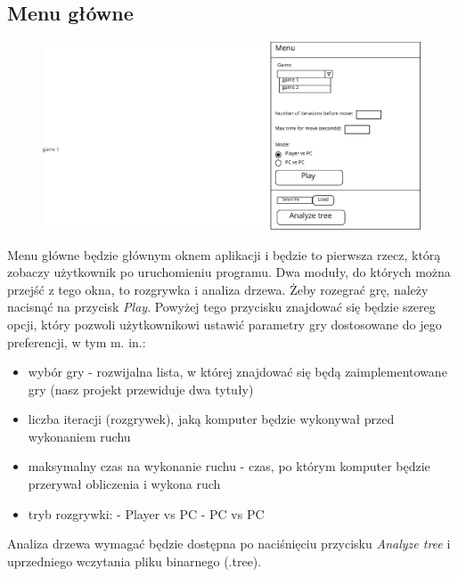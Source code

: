 \documentclass{article}
\begin{document}
	\subsection{Menu główne}
	\begin{figure}[h!]
		\centering
		\includegraphics[scale=0.8, trim={18.8cm 0 0 0},clip]{menu-eps}
	\end{figure}
	Menu główne będzie głównym oknem aplikacji i będzie to pierwsza rzecz, którą zobaczy użytkownik po uruchomieniu programu. Dwa moduły, do których można przejść z tego okna, to rozgrywka i analiza drzewa.
	Żeby rozegrać grę, należy nacisnąć na przycisk \textit{Play}. Powyżej tego przycisku znajdować się będzie szereg opcji, który pozwoli użytkownikowi ustawić parametry gry dostosowane do jego preferencji, w tym m. in.:
	\begin{itemize}
		\item wybór gry - rozwijalna lista, w której znajdować się będą zaimplementowane gry (nasz projekt przewiduje dwa tytuły)
		\item liczba iteracji (rozgrywek), jaką komputer będzie wykonywał przed wykonaniem ruchu
		\item maksymalny czas na wykonanie ruchu - czas, po którym komputer będzie przerywał obliczenia i wykona ruch
		\item tryb rozgrywki:
		\subitem - Player vs PC
		\subitem - PC vs PC
	\end{itemize}
	Analiza drzewa wymagać będzie dostępna po naciśnięciu przycisku \textit{Analyze tree} i uprzedniego wczytania pliku binarnego (.tree).
\end{document}
